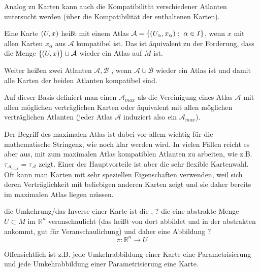 \documentclass[../H_Analysis_main.tex]{subfiles}
\begin{document}
Analog zu Karten kann auch die Kompatibilität verschiedener Atlanten untersucht werden (über die Kompatibilität der enthaltenen Karten).

\begin{defi}[Kompatibilität]
Eine Karte $\qty(U, x)$ heißt  mit einem Atlas $\mathcal{A} = \qty{\qty(U_\alpha, x_\alpha): \; \alpha \in I}$, wenn $x$ mit allen Karten $x_\alpha$ aus $\mathcal{A}$ kompatibel ist. Das ist äquivalent zu der Forderung, dass die Menge $\qty{\qty(U, x)} \cup \mathcal{A}$ wieder ein Atlas auf $M$ ist.

Weiter heißen zwei Atlanten $\mathcal{A}, \mathcal{B}$ , wenn $\mathcal{A} \cup \mathcal{B}$ wieder ein Atlas ist und damit alle Karten der beiden Atlanten kompatibel sind.

Auf dieser Basis definiert man einen  $\mathcal{A}_{max}$ als die Vereinigung eines Atlas $\mathcal{A}$ mit allen möglichen verträglichen Karten oder äquivalent mit allen möglichen verträglichen Atlanten (jeder Atlas $\mathcal{A}$ induziert also ein $\mathcal{A}_{max}$).
\end{defi}

Der Begriff des maximalen Atlas ist dabei vor allem wichtig für die mathematische Stringenz, wie noch klar werden wird. In vielen Fällen reicht es aber aus, mit zum maximalen Atlas kompatiblen Atlanten zu arbeiten, wie z.B. $\tau_{\mathcal{A}_{max}} = \tau_\mathcal{A}$ zeigt. Einer der Hauptvorteile ist aber die sehr flexible Kartenwahl. Oft kann man Karten mit sehr speziellen Eigenschaften verwenden, weil sich deren Verträglichkeit mit beliebigen anderen Karten zeigt und sie daher bereits im maximalen Atlas liegen müssen.


\begin{defi}[Parametrisierung]
die Umkehrung/das Inverse einer Karte ist die , ? die eine abstrakte Menge $U \subset M$ im $\mathbb{R}^n$ veranschaulicht (das heißt von dort abbildet und in der abstrakten ankommt, gut für Veranschaulichung) und daher eine Abbildung ?
\begin{equation}
\pi: \mathbb{R}^n \rightarrow U
\end{equation}
\end{defi}

Offensichtlich ist z.B. jede Umkehrabbildung einer Karte eine Parametrisierung und jede Umkehrabbildung einer Parametrisierung eine Karte.
\end{document}

